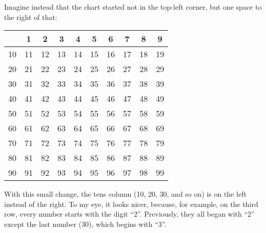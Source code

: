 \documentclass[12pt]{article}
\newcommand{\tablesize}{\footnotesize\sffamily}
\begin{document}
Imagine instead that the chart started not in the top-left corner,
but one space to the right of that:
\begin{center}\tablesize
\begin{tabular}{|c|c|c|c|c|c|c|c|c|c|}
\hline
    &  1 &  2 &  3 &  4 &  5 &  6 &  7 &  8 &  9 \\ \hline
 10 & 11 & 12 & 13 & 14 & 15 & 16 & 17 & 18 & 19 \\ \hline
 20 & 21 & 22 & 23 & 24 & 25 & 26 & 27 & 28 & 29 \\ \hline
 30 & 31 & 32 & 33 & 34 & 35 & 36 & 37 & 38 & 39 \\ \hline
 40 & 41 & 42 & 43 & 44 & 45 & 46 & 47 & 48 & 49 \\ \hline
 50 & 51 & 52 & 53 & 54 & 55 & 56 & 57 & 58 & 59 \\ \hline
 60 & 61 & 62 & 63 & 64 & 65 & 66 & 67 & 68 & 69 \\ \hline
 70 & 71 & 72 & 73 & 74 & 75 & 76 & 77 & 78 & 79 \\ \hline
 80 & 81 & 82 & 83 & 84 & 85 & 86 & 87 & 88 & 89 \\ \hline
 90 & 91 & 92 & 93 & 94 & 95 & 96 & 97 & 98 & 99 \\ \hline
\end{tabular}
\end{center}
With this small change, the tens column (10, 20, 30, and so on) is on
the left instead of the right.  To my eye, it looks nicer, because,
for example, on the third row, every number starts with the digit
``2''.  Previously, they all began with ``2'' except the last number
(30), which begins with ``3''.
\end{document}
